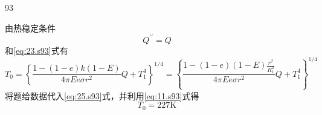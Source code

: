 \begin{solution}{93}
\begin{subsolution}
由热稳定条件
\begin{equation}
Q ^ {\prime \prime} = Q
\label{eq:24.s93}
\end{equation}
和\eqref{eq:23.s93}式有
\begin{equation}
T _ {0} = \left\{\frac {1 - (1 - e) k (1 - E)}{4 \pi E e \sigma r ^ {2}} Q + T _ {1} ^ {4} \right\} ^ {1 / 4} = \left\{\frac {1 - (1 - e) (1 - E) \frac {r ^ {2}}{R _ {1} ^ {2}}}{4 \pi E e \sigma r ^ {2}} Q + T _ {1} ^ {4} \right\} ^ {1 / 4}
\label{eq:25.s93}
\end{equation}
将题给数据代入\eqref{eq:25.s93}式，并利用\eqref{eq:11.s93}式得
\begin{equation}
T _ {0} = 2 2 7 \mathrm{K}
\label{eq:26.s93}
\end{equation}
\end{subsolution}
\end{solution}